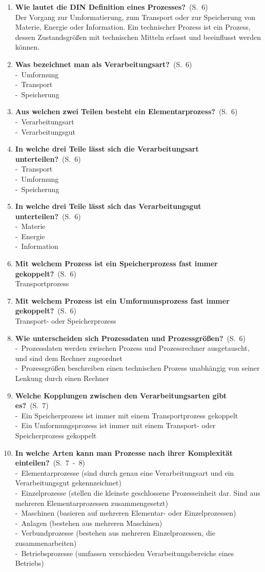 \documentclass[a4paper,12pt]{article}
\newcommand{\question}[3]{\pagebreak[3]\item {\textbf{#1?}}\ (S.\ #2)#3}
\newcommand{\catchword}[1]{\\-\ #1}
\newcommand{\normaltext}[1]{\\#1}
\newcommand{\page}[1]{#1}
\newcommand{\pages}[2]{#1\ -\ #2}
\begin{document}
\begin{enumerate}
  \question{Wie lautet die DIN Definition eines Prozesses}{\page{6}}
  {
    \normaltext{Der Vorgang zur Umformatierung, zum Transport oder zur Speicherung von Materie,
                Energie oder Information. Ein technischer Prozess ist ein Prozess, dessen
                Zustandsgrößen mit technischen Mitteln erfasst und beeinflusst werden können.}
  }

  \question{Was bezeichnet man als Verarbeitungsart}{\page{6}}
  {
    \catchword{Umformung}
    \catchword{Transport}
    \catchword{Speicherung}
  }

  \question{Aus welchen zwei Teilen besteht ein Elementarprozess}{\page{6}}
  {
    \catchword{Verarbeitungsart}
    \catchword{Verarbeitungsgut}
  }

  \question{In welche drei Teile lässt sich die Verarbeitungsart unterteilen}{\page{6}}
  {
    \catchword{Transport}
    \catchword{Umformung}
    \catchword{Speicherung}
  }

  \question{In welche drei Teile lässt sich das Verarbeitungsgut unterteilen}{\page{6}}
  {
    \catchword{Materie}
    \catchword{Energie}
    \catchword{Information}
  }

  \question{Mit welchem Prozess ist ein Speicherprozess fast immer gekoppelt}{\page{6}}
  {
    \normaltext{Transportprozess}
  }

  \question{Mit welchem Prozess ist ein Umformunsprozess fast immer gekoppelt}{\page{6}}
  {
    \normaltext{Transport- oder Speicherprozess}
  }

  \question{Wie unterscheiden sich Prozessdaten und Prozessgrößen}{\page{6}}
  {
    \catchword{Prozessdaten werden zwischen Prozess und Prozessrechner ausgetauscht, und sind 
               dem Rechner zugeordnet}
    \catchword{Prozessgrößen beschreiben einen technischen Prozess unabhängig von seiner Lenkung
               durch einen Rechner}
  }

  \question{Welche Kopplungen zwischen den Verarbeitungsarten gibt es}{\page{7}}
  {
    \catchword{Ein Speicherprozess ist immer mit einem Transportprozess gekoppelt}
    \catchword{Ein Umformungsprozess ist immer mit einem Transport- oder Speicherprozess gekoppelt}
  }

  \question{In welche Arten kann man Prozesse nach ihrer Komplexität einteilen}{\pages{7}{8}}
  {
    \catchword{Elementarprozesse (sind durch genau eine Verarbeitungsart und ein 
               Verarbeitungsgut gekennzeichnet)}
    \catchword{Einzelprozesse (stellen die kleinste geschlossene Prozesseinheit dar.
               Sind aus mehreren Elementarprozessen zusammengesetzt)}
    \catchword{Maschinen (basieren auf mehreren Elementar- oder Einzelprozessen)}
    \catchword{Anlagen (bestehen aus mehreren Maschinen)}
    \catchword{Verbundprozesse (bestehen aus mehreren Einzelprozessen, die zusammenarbeiten)}
    \catchword{Betriebsprozesse (umfassen verschieden Verarbeitungsbereiche eines Betriebs)}
  }


\end{enumerate}
\end{document}
